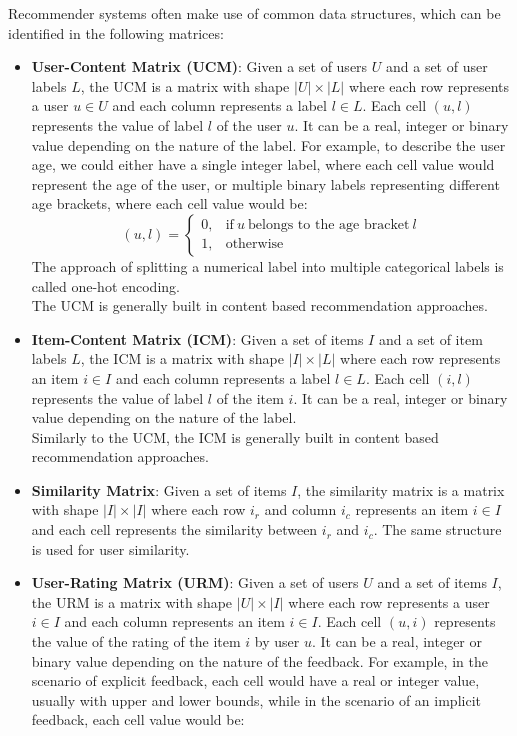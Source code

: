 Recommender systems often make use of common data structures, which can be identified in the following matrices:
\begin{itemize}
\item \textbf{User-Content Matrix (UCM)}: Given a set of users $U$ and a set of user labels $L$, the UCM is a matrix with shape $|U| \times |L|$ where each row represents a user $u \in U$ and each column represents a label $l \in L$. Each cell $(u,l)$ represents the value of label $l$ of the user $u$. It can be a real, integer or binary value depending on the nature of the label. For example, to describe the user age, we could either have a single integer label, where each cell value would represent the age of the user, or multiple binary labels representing different age brackets, where each cell value would be:
\begin{equation*}
(u,l)=
\begin{cases}
0, & \text{if}\ u\ \text{belongs to the age bracket}\ l\\
1, & \text{otherwise}
\end{cases}
\end{equation*}
The approach of splitting a numerical label into multiple categorical labels is called one-hot encoding.\\
The UCM is generally built in content based recommendation approaches.
\item \textbf{Item-Content Matrix (ICM)}: Given a set of items $I$ and a set of item labels $L$, the ICM is a matrix with shape $|I| \times |L|$ where each row represents an item $i \in I$ and each column represents a label $l \in L$. Each cell $(i,l)$ represents the value of label $l$ of the item $i$. It can be a real, integer or binary value depending on the nature of the label.\\
Similarly to the UCM, the ICM is generally built in content based recommendation approaches.
\item \textbf{Similarity Matrix}: Given a set of items $I$, the similarity matrix is a matrix with shape $|I| \times |I|$ where each row $i_r$ and column $i_c$ represents an item $i \in I$ and each cell represents the similarity between $i_r$ and $i_c$. The same structure is used for user similarity.
\item \textbf{User-Rating Matrix (URM)}: Given a set of users $U$ and a set of items $I$, the URM is a matrix with shape $|U| \times |I|$ where each row represents a user $i \in I$ and each column represents an item $i \in I$. Each cell $(u,i)$ represents the value of the rating of the item $i$ by user $u$. It can be a real, integer or binary value depending on the nature of the feedback. For example, in the scenario of explicit feedback, each cell would have a real or integer value, usually with upper and lower bounds, while in the scenario of an implicit feedback, each cell value would be:\\

\end{itemize}
